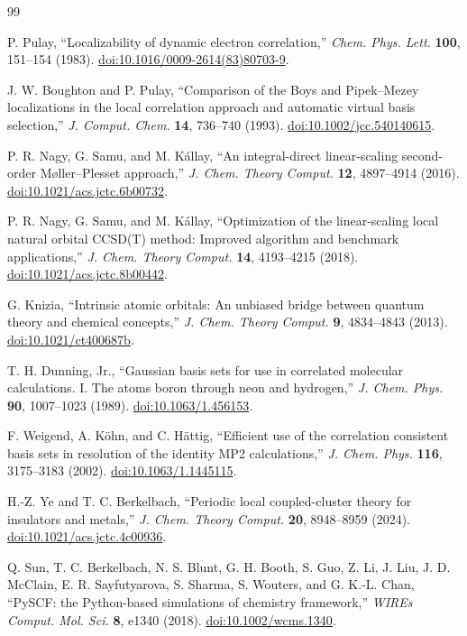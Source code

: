 \documentclass[11pt]{article}
\begin{document}
\FloatBarrier
\begin{thebibliography}{99}
\small

P. Pulay, ``Localizability of dynamic electron correlation,''
\emph{Chem. Phys. Lett.} \textbf{100}, 151--154 (1983).
\href{https://doi.org/10.1016/0009-2614(83)80703-9}{doi:10.1016/0009-2614(83)80703-9}.

J. W. Boughton and P. Pulay, ``Comparison of the Boys and Pipek--Mezey
localizations in the local correlation approach and automatic virtual basis
selection,'' \emph{J. Comput. Chem.} \textbf{14}, 736--740 (1993).
\href{https://doi.org/10.1002/jcc.540140615}{doi:10.1002/jcc.540140615}.

P. R. Nagy, G. Samu, and M. K\'allay, ``An integral-direct linear-scaling
second-order M\o ller--Plesset approach,'' \emph{J. Chem. Theory Comput.}
\textbf{12}, 4897--4914 (2016).
\href{https://doi.org/10.1021/acs.jctc.6b00732}{doi:10.1021/acs.jctc.6b00732}.

P. R. Nagy, G. Samu, and M. K\'allay, ``Optimization of the linear-scaling
local natural orbital CCSD(T) method: Improved algorithm and benchmark
applications,'' \emph{J. Chem. Theory Comput.} \textbf{14}, 4193--4215 (2018).
\href{https://doi.org/10.1021/acs.jctc.8b00442}{doi:10.1021/acs.jctc.8b00442}.

G. Knizia, ``Intrinsic atomic orbitals: An unbiased bridge between quantum
theory and chemical concepts,'' \emph{J. Chem. Theory Comput.} \textbf{9},
4834--4843 (2013).
\href{https://doi.org/10.1021/ct400687b}{doi:10.1021/ct400687b}.

T. H. Dunning, Jr., ``Gaussian basis sets for use in correlated molecular
calculations. I. The atoms boron through neon and hydrogen,''
\emph{J. Chem. Phys.} \textbf{90}, 1007--1023 (1989).
\href{https://doi.org/10.1063/1.456153}{doi:10.1063/1.456153}.

F. Weigend, A. K\"ohn, and C. H\"attig, ``Efficient use of the correlation
consistent basis sets in resolution of the identity MP2 calculations,''
\emph{J. Chem. Phys.} \textbf{116}, 3175--3183 (2002).
\href{https://doi.org/10.1063/1.1445115}{doi:10.1063/1.1445115}.

H.-Z. Ye and T. C. Berkelbach, ``Periodic local coupled-cluster theory for
insulators and metals,'' \emph{J. Chem. Theory Comput.} \textbf{20},
8948--8959 (2024).
\href{https://doi.org/10.1021/acs.jctc.4c00936}{doi:10.1021/acs.jctc.4c00936}.

Q. Sun, T. C. Berkelbach, N. S. Blunt, G. H. Booth, S. Guo, Z. Li,
J. Liu, J. D. McClain, E. R. Sayfutyarova, S. Sharma, S. Wouters, and
G. K.-L. Chan, ``PySCF: the Python-based simulations of chemistry
framework,'' \emph{WIREs Comput. Mol. Sci.} \textbf{8}, e1340 (2018).
\href{https://doi.org/10.1002/wcms.1340}{doi:10.1002/wcms.1340}.

\end{thebibliography}
\end{document}
